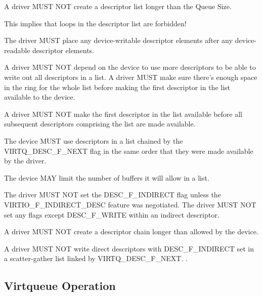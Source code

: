 A driver MUST NOT create a descriptor list longer than the Queue
Size.

This implies that loops in the descriptor list are forbidden!

The driver MUST place any device-writable descriptor elements after
any device-readable descriptor elements.

A driver MUST NOT depend on the device to use more descriptors
to be able to write out all descriptors in a list. A driver
MUST make sure there's enough space in the ring
for the whole list before making the first descriptor in the list
available to the device.

A driver MUST NOT make the first descriptor in the list available
before all subsequent descriptors comprising the list are made
available.

The device MUST use descriptors in a list chained by the
VIRTQ_DESC_F_NEXT flag in the same order that they
were made available by the driver.

The device MAY limit the number of buffers it will allow in a
list.

The driver MUST NOT set the DESC_F_INDIRECT flag unless the
VIRTIO_F_INDIRECT_DESC feature was negotiated.   The driver MUST NOT
set any flags except DESC_F_WRITE within an indirect descriptor.

A driver MUST NOT create a descriptor chain longer than allowed
by the device.

A driver MUST NOT write direct descriptors with
DESC_F_INDIRECT set in a scatter-gather list linked by
VIRTQ_DESC_F_NEXT.
.

\subsection{Virtqueue Operation}\label{sec:Basic Facilities of a Virtio Device / Packed Virtqueues / Virtqueue Operation}

